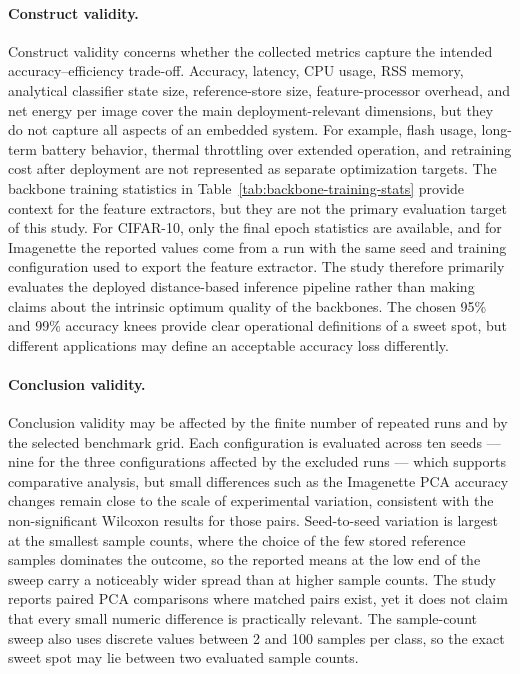 \documentclass[sigconf,review,nonacm]{acmart}
\begin{document}
\paragraph{Construct validity.}
Construct validity concerns whether the collected metrics capture the intended accuracy--efficiency trade-off.
Accuracy, latency, CPU usage, RSS memory, analytical classifier state size, reference-store size, feature-processor overhead, and net energy per image cover the main deployment-relevant dimensions, but they do not capture all aspects of an embedded system.
For example, flash usage, long-term battery behavior, thermal throttling over extended operation, and retraining cost after deployment are not represented as separate optimization targets.
The backbone training statistics in Table~\ref{tab:backbone-training-stats} provide context for the feature extractors, but they are not the primary evaluation target of this study.
For CIFAR-10, only the final epoch statistics are available, and for Imagenette the reported values come from a run with the same seed and training configuration used to export the feature extractor.
The study therefore primarily evaluates the deployed distance-based inference pipeline rather than making claims about the intrinsic optimum quality of the backbones.
The chosen 95\% and 99\% accuracy knees provide clear operational definitions of a sweet spot, but different applications may define an acceptable accuracy loss differently.

\paragraph{Conclusion validity.}
Conclusion validity may be affected by the finite number of repeated runs and by the selected benchmark grid.
Each configuration is evaluated across ten seeds --- nine for the three configurations affected by the excluded runs --- which supports comparative analysis, but small differences such as the Imagenette PCA accuracy changes remain close to the scale of experimental variation, consistent with the non-significant Wilcoxon results for those pairs.
Seed-to-seed variation is largest at the smallest sample counts, where the choice of the few stored reference samples dominates the outcome, so the reported means at the low end of the sweep carry a noticeably wider spread than at higher sample counts.
The study reports paired PCA comparisons where matched pairs exist, yet it does not claim that every small numeric difference is practically relevant.
The sample-count sweep also uses discrete values between 2 and 100 samples per class, so the exact sweet spot may lie between two evaluated sample counts.
\end{document}
